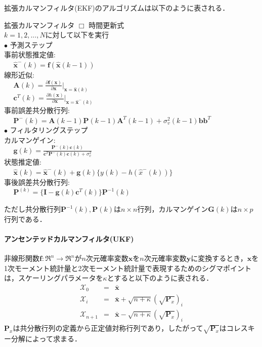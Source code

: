 \documentclass[twocolumn,oneside,a4paper]{article}
\begin{document}
拡張カルマンフィルタ(EKF)のアルゴリズムは以下のように表される．
  \begin{breakitembox}[l]{拡張カルマンフィルタ}
    \hspace{-0.3in} $\Box$ 時間更新式\\
    $k=1,2,...,N$に対して以下を実行\\
     $\bullet$ 予測ステップ\\
     事前状態推定値: \\
     $\:\:\:\:\:\: \hat{\bm{x}}^{-}(k) = \bm{f}(\hat{\bm{x}}(k-1))$ \\
線形近似: \\
     $\:\:\:\:\:\: \bm{A}(k) = \frac{\partial \bm{f}(\bm{x})}{\partial \bm{x}} \bigg| _{\bm{x}=\hat{\bm{x}}(k)} $ \\
     $\:\:\:\:\:\: \bm{c}^T(k) = \frac{\partial h(\bm{x})}{\partial \bm{x} } \bigg| _{\bm{x}=\hat{\bm{x}}^{-}(k)} $ \\
     事前誤差共分散行列: \\
     $\:\:\:\:\:\: \bm{P}^{-}(k) = \bm{A}(k-1)\bm{P}(k-1)\bm{A}^T(k-1) + \sigma_v^2(k-1)\bm{b}\bm{b}^T$ \\
     $\bullet$ フィルタリングステップ\\
     カルマンゲイン: \\
     $\:\:\:\:\:\: \bm{g}(k)= \frac{\bm{P}^{-}(k) \bm{c}(k)}{\bm{c}^T \bm{P}^{-}(k)\bm{c}(k) + \sigma_v^2} $\\
     状態推定値: \\
     $\:\:\:\:\:\: \hat{\bm{x}}(k) = \hat{\bm{x}}^{-}(k) + \bm{g}(k)\{y(k)-h(\hat{x}^{-}(k))\}$\\
     事後誤差共分散行列: \\
     $\:\:\:\:\:\: \bm{P}^(k)=\{ \bm{I}-\bm{g}(k)\bm{c}^T(k)\} \bm{P}^{-1}(k)$
  \end{breakitembox}

ただし共分散行列$\bm{P}^{-1}(k), \bm{P}(k)$は$n \times n$行列，カルマンゲイン$\bm{G}(k)$は$n \times p$行列である．


\paragraph{アンセンテッドカルマンフィルタ(UKF)}
非線形関数$\bm{f}: \mathfrak{R}^n \rightarrow \mathfrak{R}^n$が$n$次元確率変数$\bm{x}$を$n$次元確率変数$\bm{y}$に変換するとき，$\bm{x}$を1次モーメント統計量と2次モーメント統計量で表現するためのシグマポイントは，スケーリングパラメータを$\kappa$とすると以下のように表される．
\begin{eqnarray*}
	\mathscr{X}_0 &=& \bar{\bm{x}} \\
	\mathscr{X}_i &=& \bar{\bm{x}} + \sqrt{n+\kappa}(\sqrt{\bm{P}_x})_i\\
	\mathscr{X}_{n+1} &=& \bar{\bm{x}} - \sqrt{n+\kappa}(\sqrt{\bm{P}_x})_i
\end{eqnarray*}
$\bm{P}_x$は共分散行列の定義から正定値対称行列であり，したがって$\sqrt{\bm{P}_x}$はコレスキー分解によって求まる．
\end{document}
